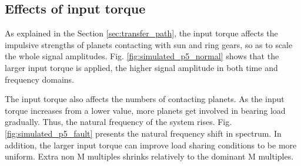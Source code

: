 \documentclass[a4paper,fleqn]{cas-sc}%
\begin{document}
\subsection{Effects of input torque}
\par As explained in the Section \ref{sec:transfer_path}, the input torque affects the impulsive strengths of planets contacting with sun and ring gears, so as to scale the whole signal amplitudes. Fig. \ref{fig:simulated_p5_normal} shows that the larger input torque is applied, the higher signal amplitude in both time and frequency domains. 
\par The input torque also affects the numbers of contacting planets. As the input torque increases from a lower value, more planets get involved in bearing load gradually. Thus, the natural frequency of the system rises. Fig. \ref{fig:simulated_p5_fault} presents the natural frequency shift in spectrum. In addition, the larger input torque can improve load sharing conditions to be more uniform. Extra non M multiples shrinks relatively to the dominant M multiples. 
\end{document}
